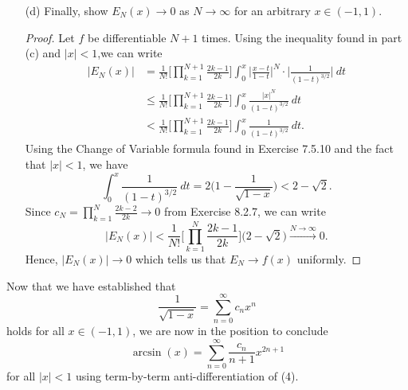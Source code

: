 \begin{enumerate}
\begin{proof}[Solution]
\begin{align*}
                                                     &\leq \sqrt{ (x - t )^{2} }  \\
                                                     &= |  x -t  | \\
                                                     &\leq |  x  |
        \end{align*}
        which holds for \(  t   \).
        \end{proof}
    \item[(d)] Finally, show \( E_{N}(x) \to 0  \) as \( N \to \infty  \) for an arbitrary \( x \in (-1 , 1) \).
        \begin{proof}
        Let \( f  \) be differentiable \( N + 1  \) times. Using the inequality found in part (c) and \( |  x  |  < 1  \),we can write 
        \begin{align*}
            |E_{N}(x)| &= \frac{ 1 }{ N! }  \Big[ \prod_{k=1}^{N+1}  \frac{ 2k - 1  }{ 2k  } \Big] \int_{ 0 }^{ x  } \Big|  \frac{ x -t  }{ 1 - t  } \Big|^{N}      \cdot \Big|  \frac{ 1 }{ (1-t)^{3/2} } \Big| \  dt   \\
                     &\leq \frac{ 1 }{ N! } \Big[ \prod_{k=1}^{N+1} \frac{ 2k - 1  }{ 2k  } \Big]  \int_{ 0 }^{ x }  \frac{ |x|^{N} }{  (1-t)^{3/2} } \  dt \\
                     &< \frac{ 1 }{ N! }  \Big[ \prod_{k=1}^{N+1} \frac{ 2k - 1  }{ 2k  }\Big] \int_{ 0 }^{ x }  \frac{ 1 }{ (1-t)^{3/2} } \  dt.
        \end{align*}
        Using the Change of Variable formula found in Exercise 7.5.10 and the fact that \( |  x  |  < 1  \), we have  
        \[  \int_{ 0 }^{ x }  \frac{ 1 }{ (1-t)^{3/2} } \  dt = 2 \Big(  1 - \frac{ 1 }{ \sqrt{ 1 - x  }  }  \Big) < 2 - \sqrt{ 2 }.  \]
        Since \( c_{N} = \prod_{k=1}^{N} \frac{ 2k-2 }{ 2k } \to 0  \) from Exercise 8.2.7, we can write
        \[  |E_{N}(x)| < \frac{ 1 }{ N! } \Big[ \prod_{k=1}^{N} \frac{ 2k-1 }{ 2k }  \Big] \Big( 2 - \sqrt{ 2 }   \Big) \xrightarrow{N\rightarrow\infty} 0.  \]
        Hence, \( |E_{N}(x)| \to 0  \) which tells us that \( E_{N} \to f(x)  \) uniformly.
        \end{proof}
\end{enumerate}
Now that we have established that 
\[  \frac{ 1 }{ \sqrt{ 1 - x  }  }  = \sum_{ n=0 }^{ \infty  } c_{n} x^{n} \tag{4}  \] holds for all \( x \in (-1,1 ) \), we are now in the position to conclude 
\[  \arcsin(x) = \sum_{ n=0  }^{ \infty  } \frac{ c_{n} }{  n+1  } x^{2n+1}  \] for all \( |  x  |  < 1  \) using term-by-term anti-differentiation of (4).

